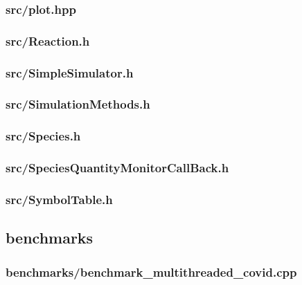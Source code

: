 \subsubsection{src/plot.hpp}

\newpage
\subsubsection{src/Reaction.h}

\newpage
\subsubsection{src/SimpleSimulator.h}

\newpage
\subsubsection{src/SimulationMethods.h}

\newpage
\subsubsection{src/Species.h}

\newpage
\subsubsection{src/SpeciesQuantityMonitorCallBack.h}

\newpage
\subsubsection{src/SymbolTable.h}

\newpage
\subsection{benchmarks}
\subsubsection{benchmarks/benchmark\_multithreaded\_covid.cpp} \label{subsec:benchmarksmul}

\newpage
